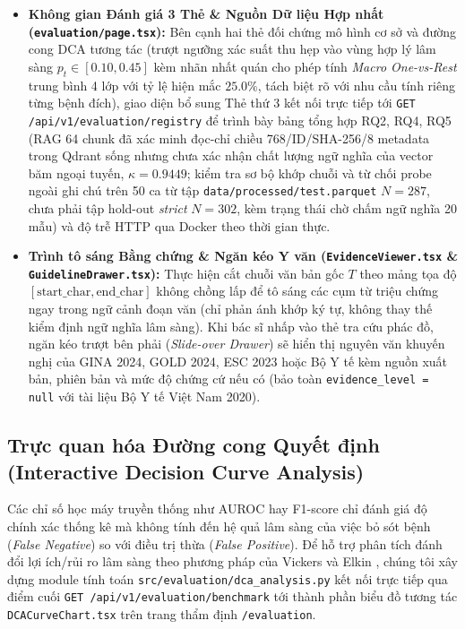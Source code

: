 \begin{itemize}[leftmargin=1.8em, itemsep=0.2em]
    \item \textbf{Không gian Đánh giá 3 Thẻ \& Nguồn Dữ liệu Hợp nhất (\texttt{evaluation/page.tsx}):} Bên cạnh hai thẻ đối chứng mô hình cơ sở và đường cong DCA tương tác (trượt ngưỡng xác suất thu hẹp vào vùng hợp lý lâm sàng $p_t \in [0.10, 0.45]$ kèm nhãn nhất quán cho phép tính \textit{Macro One-vs-Rest} trung bình 4 lớp với tỷ lệ hiện mắc $25.0\%$, tách biệt rõ với nhu cầu tính riêng từng bệnh đích), giao diện bổ sung Thẻ thứ 3 kết nối trực tiếp tới \texttt{GET /api/v1/evaluation/registry} để trình bày bảng tổng hợp RQ2, RQ4, RQ5 (RAG 64 chunk đã xác minh đọc-chỉ chiều 768/ID/SHA-256/8 metadata trong Qdrant sống nhưng chưa xác nhận chất lượng ngữ nghĩa của vector băm ngoại tuyến, $\kappa = 0.9449$; kiểm tra sơ bộ khớp chuỗi và từ chối probe ngoài ghi chú trên 50 ca từ tập \texttt{data/processed/test.parquet} $N=287$, chưa phải tập hold-out \textit{strict} $N=302$, kèm trạng thái chờ chấm ngữ nghĩa 20 mẫu) và độ trễ HTTP qua Docker theo thời gian thực.
    \item \textbf{Trình tô sáng Bằng chứng \& Ngăn kéo Y văn (\texttt{EvidenceViewer.tsx} \& \texttt{GuidelineDrawer.tsx}):} Thực hiện cắt chuỗi văn bản gốc $T$ theo mảng tọa độ $[\text{start\_char}, \text{end\_char}]$ không chồng lấp để tô sáng các cụm từ triệu chứng ngay trong ngữ cảnh đoạn văn (chỉ phản ánh khớp ký tự, không thay thế kiểm định ngữ nghĩa lâm sàng). Khi bác sĩ nhấp vào thẻ tra cứu phác đồ, ngăn kéo trượt bên phải (\textit{Slide-over Drawer}) sẽ hiển thị nguyên văn khuyến nghị của GINA 2024, GOLD 2024, ESC 2023 hoặc Bộ Y tế kèm nguồn xuất bản, phiên bản và mức độ chứng cứ nếu có (bảo toàn \texttt{evidence\_level = null} với tài liệu Bộ Y tế Việt Nam 2020).
\end{itemize}

\subsection{Trực quan hóa Đường cong Quyết định (Interactive Decision Curve Analysis)}
Các chỉ số học máy truyền thống như AUROC hay F1-score chỉ đánh giá độ chính xác thống kê mà không tính đến hệ quả lâm sàng của việc bỏ sót bệnh (\textit{False Negative}) so với điều trị thừa (\textit{False Positive}). Để hỗ trợ phân tích đánh đổi lợi ích/rủi ro lâm sàng theo phương pháp của Vickers và Elkin \cite{vickers2006decision}, chúng tôi xây dựng module tính toán \texttt{src/evaluation/dca\_analysis.py} kết nối trực tiếp qua điểm cuối \texttt{GET /api/v1/evaluation/benchmark} tới thành phần biểu đồ tương tác \texttt{DCACurveChart.tsx} trên trang thẩm định \texttt{/evaluation}.

